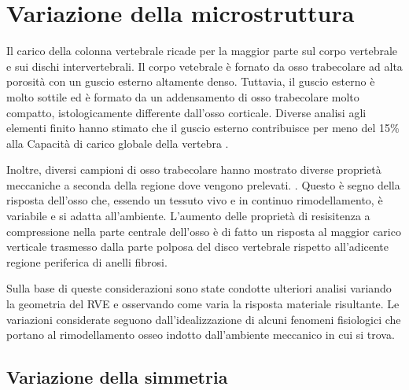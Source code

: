 \documentclass[a4paper,num-refs]{oup-contemporary}
\begin{document}
\section{Variazione della microstruttura}

Il carico della colonna vertebrale ricade per la maggior parte sul corpo vertebrale e sui dischi intervertebrali. Il corpo vetebrale è fornato da osso trabecolare ad alta porosità con un guscio esterno altamente denso. Tuttavia, il guscio esterno è molto sottile ed è formato da un addensamento di osso trabecolare molto compatto, istologicamente differente dall'osso corticale. Diverse analisi agli elementi finito hanno stimato che il guscio esterno contribuisce per meno del 15\% alla Capacità di carico globale della vertebra \citep{Ferguson:2003, Silva:1997}.

Inoltre, diversi campioni di osso trabecolare hanno mostrato diverse proprietà meccaniche a seconda della regione dove vengono prelevati. \citep{Keller:1989,Keller:1993}. Questo è segno della risposta dell'osso che, essendo un tessuto vivo e in continuo rimodellamento, è variabile e si adatta all'ambiente. L'aumento delle proprietà di resisitenza a compressione nella parte centrale dell'osso è di fatto un risposta al maggior carico verticale trasmesso dalla parte polposa del disco vertebrale rispetto all'adicente regione periferica di anelli fibrosi. 

Sulla base di queste considerazioni sono state condotte ulteriori analisi variando la geometria del RVE e osservando come varia la risposta materiale risultante. Le variazioni considerate seguono dall'idealizzazione di alcuni fenomeni fisiologici che portano al rimodellamento osseo indotto dall'ambiente meccanico in cui si trova.



\subsection{Variazione della simmetria}
\end{document}
